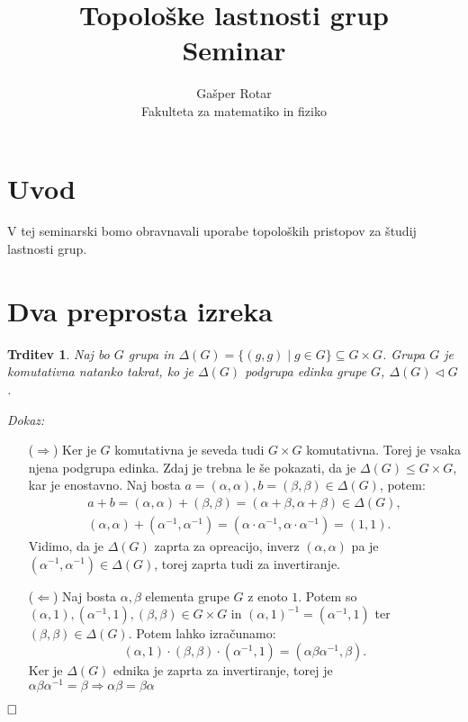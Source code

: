 \documentclass[a4paper,12pt]{article}
\title{Topološke lastnosti grup \\ 
\Large Seminar}
\author{Gašper Rotar \\
Fakulteta za matematiko in fiziko}
\def\qed{$\hfill\Box$}   %
\newtheorem{trditev}{Trditev}
\begin{document}
\maketitle

\section{Uvod}

V tej seminarski bomo obravnavali uporabe topoloških pristopov za študij lastnosti grup.



\section{Dva preprosta izreka}

\begin{trditev}
    Naj bo $G$ grupa in $\Delta(G) = \{(g,g) \mid g \in G \} \subseteq G \times G$.
    Grupa $G$ je komutativna natanko takrat, ko je $\Delta(G)$ podgrupa edinka grupe $G$, $\Delta(G) \triangleleft G$.
\end{trditev}


\noindent
{\em Dokaz:\/}
    \begin{itemize}
        \item[($\Rightarrow$)] Ker je $G$ komutativna je seveda tudi $G \times G$ komutativna. Torej je vsaka njena podgrupa edinka.
            Zdaj je trebna le še pokazati, da je $\Delta(G) \le G \times G$, kar je enostavno. Naj bosta $a = (\alpha, \alpha), b = (\beta, \beta) \in \Delta(G)$, potem:
            \begin{gather*}
                a + b = (\alpha, \alpha) + (\beta, \beta) = (\alpha + \beta, \alpha + \beta) \in \Delta(G), \\
                (\alpha, \alpha) + (\alpha^{-1}, \alpha^{-1}) = (\alpha \cdot \alpha^{-1}, \alpha \cdot \alpha^{-1}) = (1,1).
            \end{gather*}
            Vidimo, da je $\Delta(G)$ zaprta za opreacijo, inverz $(\alpha, \alpha)$ pa je $(\alpha^{-1}, \alpha^{-1}) \in \Delta(G)$, torej zaprta tudi za invertiranje.
        \item[($\Leftarrow$)] Naj bosta $\alpha, \beta$ elementa grupe $G$ z enoto $1$. Potem so $(\alpha,1), (\alpha^{-1}, 1), (\beta, \beta) \in G \times G$ in
            $(\alpha,1)^{-1} = (\alpha^{-1},1)$ ter $(\beta, \beta) \in \Delta(G)$. Potem lahko izračunamo:
            \[(\alpha,1) \cdot (\beta, \beta) \cdot (\alpha^{-1}, 1) = (\alpha\beta\alpha^{-1}, \beta).\]
            Ker je $\Delta(G)$ ednika je zaprta za invertiranje, torej je $\alpha\beta\alpha^{-1} = \beta \Rightarrow \alpha\beta = \beta\alpha$
    \end{itemize}
\qed
\end{document}
